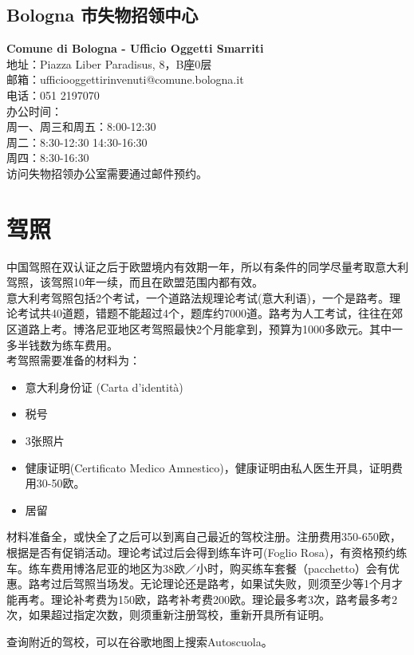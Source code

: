 \subsection{Bologna 市失物招领中心}
\textbf{Comune di Bologna - Ufficio Oggetti Smarriti}\\
地址：Piazza Liber Paradisus, 8，B座0层\\
邮箱：ufficiooggettirinvenuti@comune.bologna.it\\
电话：051 2197070 \\
办公时间：\\
周一、周三和周五：8:00-12:30\\
周二：8:30-12:30 14:30-16:30\\
周四：8:30-16:30\\
访问失物招领办公室需要通过邮件预约。\\



\section{驾照}

中国驾照在双认证之后于欧盟境内有效期一年，所以有条件的同学尽量考取意大利驾照，该驾照10年一续，而且在欧盟范围内都有效。\\
意大利考驾照包括2个考试，一个道路法规理论考试(意大利语)，一个是路考。理论考试共40道题，错题不能超过4个，题库约7000道。路考为人工考试，往往在郊区道路上考。博洛尼亚地区考驾照最快2个月能拿到，预算为1000多欧元。其中一多半钱数为练车费用。\\
考驾照需要准备的材料为：
\begin{itemize}
\item 意大利身份证 (Carta d'identità)
\item 税号
\item 3张照片
\item 健康证明(Certificato Medico Amnestico)，健康证明由私人医生开具，证明费用30-50欧。
\item 居留
\end{itemize}
材料准备全，或快全了之后可以到离自己最近的驾校注册。注册费用350-650欧，根据是否有促销活动。理论考试过后会得到练车许可(Foglio Rosa)，有资格预约练车。练车费用博洛尼亚的地区为38欧／小时，购买练车套餐（pacchetto）会有优惠。路考过后驾照当场发。无论理论还是路考，如果试失败，则须至少等1个月才能再考。理论补考费为150欧，路考补考费200欧。理论最多考3次，路考最多考2次，如果超过指定次数，则须重新注册驾校，重新开具所有证明。

查询附近的驾校，可以在谷歌地图上搜索Autoscuola。





